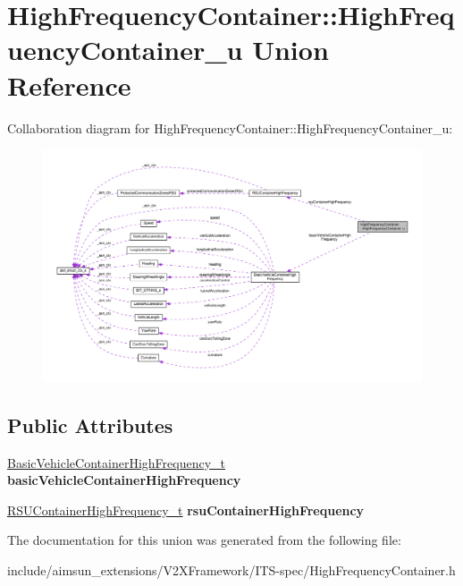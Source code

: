 \hypertarget{unionHighFrequencyContainer_1_1HighFrequencyContainer__u}{}\section{High\+Frequency\+Container\+:\+:High\+Frequency\+Container\+\_\+u Union Reference}
\label{unionHighFrequencyContainer_1_1HighFrequencyContainer__u}


Collaboration diagram for High\+Frequency\+Container\+:\+:High\+Frequency\+Container\+\_\+u\+:\nopagebreak
\begin{figure}[H]
\begin{center}
\leavevmode
\includegraphics[width=350pt]{unionHighFrequencyContainer_1_1HighFrequencyContainer__u__coll__graph}
\end{center}
\end{figure}
\subsection*{Public Attributes}
\begin{DoxyCompactItemize}
\item 
\hyperlink{structBasicVehicleContainerHighFrequency}{Basic\+Vehicle\+Container\+High\+Frequency\+\_\+t} {\bfseries basic\+Vehicle\+Container\+High\+Frequency}\hypertarget{unionHighFrequencyContainer_1_1HighFrequencyContainer__u_abbed6afac895bf2093d6a0b78423fbee}{}\label{unionHighFrequencyContainer_1_1HighFrequencyContainer__u_abbed6afac895bf2093d6a0b78423fbee}

\item 
\hyperlink{structRSUContainerHighFrequency}{R\+S\+U\+Container\+High\+Frequency\+\_\+t} {\bfseries rsu\+Container\+High\+Frequency}\hypertarget{unionHighFrequencyContainer_1_1HighFrequencyContainer__u_abd3bf91cf04b2e4e163d2a490aac36cf}{}\label{unionHighFrequencyContainer_1_1HighFrequencyContainer__u_abd3bf91cf04b2e4e163d2a490aac36cf}

\end{DoxyCompactItemize}


The documentation for this union was generated from the following file\+:\begin{DoxyCompactItemize}
\item 
include/aimsun\+\_\+extensions/\+V2\+X\+Framework/\+I\+T\+S-\/spec/High\+Frequency\+Container.\+h\end{DoxyCompactItemize}

